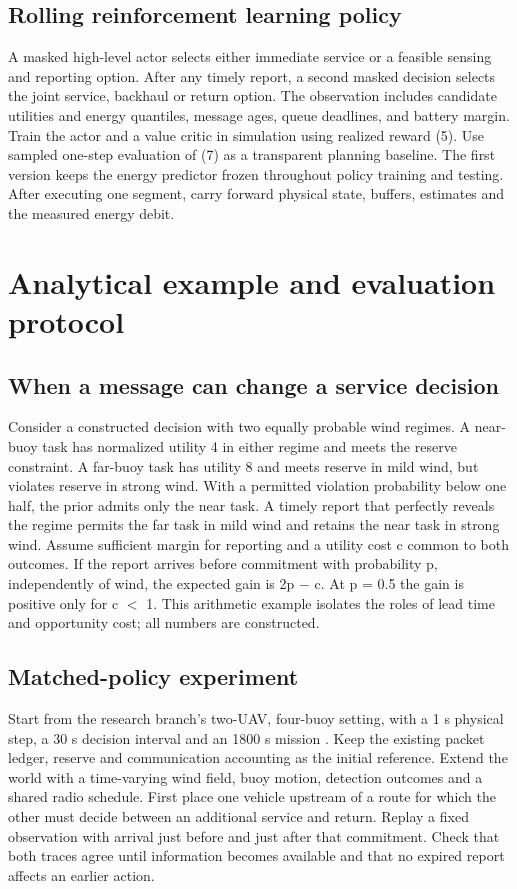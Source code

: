 \documentclass[journal]{IEEEtran}
\begin{document}
\subsection{Rolling reinforcement learning policy}
A masked high-level actor selects either immediate service or a feasible sensing and reporting option. After any timely report, a second masked decision selects the joint service, backhaul or return option. The observation includes candidate utilities and energy quantiles, message ages, queue deadlines, and battery margin. Train the actor and a value critic in simulation using realized reward (5). Use sampled one-step evaluation of (7) as a transparent planning baseline. The first version keeps the energy predictor frozen throughout policy training and testing. After executing one segment, carry forward physical state, buffers, estimates and the measured energy debit.

\section{Analytical example and evaluation protocol}
\subsection{When a message can change a service decision}
Consider a constructed decision with two equally probable wind regimes. A near-buoy task has normalized utility 4 in either regime and meets the reserve constraint. A far-buoy task has utility 8 and meets reserve in mild wind, but violates reserve in strong wind. With a permitted violation probability below one half, the prior admits only the near task. A timely report that perfectly reveals the regime permits the far task in mild wind and retains the near task in strong wind. Assume sufficient margin for reporting and a utility cost c common to both outcomes. If the report arrives before commitment with probability p, independently of wind, the expected gain is 2p $-$ c. At p = 0.5 the gain is positive only for c $<$ 1. This arithmetic example isolates the roles of lead time and opportunity cost; all numbers are constructed.

\subsection{Matched-policy experiment}
Start from the research branch's two-UAV, four-buoy setting, with a 1 s physical step, a 30 s decision interval and an 1800 s mission \cite{r7}. Keep the existing packet ledger, reserve and communication accounting as the initial reference. Extend the world with a time-varying wind field, buoy motion, detection outcomes and a shared radio schedule. First place one vehicle upstream of a route for which the other must decide between an additional service and return. Replay a fixed observation with arrival just before and just after that commitment. Check that both traces agree until information becomes available and that no expired report affects an earlier action.
\end{document}
